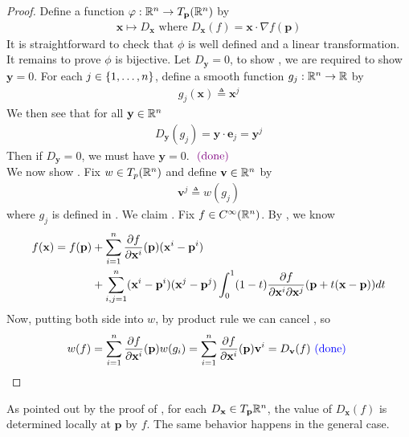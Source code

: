 \documentclass{report}
\begin{document}
\begin{proof}
Define a function $\varphi:\mathbb{R}^n\to T_\textbf{p}(\mathbb{R}^n)$ by 
\begin{align*}
\textbf{x}\mapsto D_\textbf{x}\text{ where }D_\textbf{x}(f)= \textbf{x}\cdot \nabla f(\textbf{p})
\end{align*}
It is straightforward to check that $\phi$ is well defined and a linear transformation. It remains to prove $\phi$ is bijective. Let $D_\textbf{y}=0$, to show , we are required to show $\textbf{y}=0$. For each $j \in \{ 1,\dots, n \}$, define a smooth function $g_j:\mathbb{R}^n\rightarrow \mathbb{R}$ by
\begin{align}
\label{fjxj}
g_j(\textbf{x})\triangleq \textbf{x}^j
\end{align}
We then see that for all $\textbf{y}\in\mathbb{R}^n$
\begin{align*}
D_\textbf{y}(g_j)=\textbf{y}\cdot \textbf{e}_j= \textbf{y}^j
\end{align*}
Then if $D_\textbf{y}=0$, we must have $\textbf{y}=0$. $\textcolor{violet}{\text{ (done) }}$ \\

We now show . Fix $w\in T_p(\mathbb{R}^n)$ and define $\textbf{v}\in\mathbb{R}^n$ by 
\begin{align*}
\textbf{v}^j \triangleq w(g_j)
\end{align*}
where $g_j$ is defined in  . We claim . Fix $f \in C^{\infty}(\mathbb{R}^n)$. By , we know 
\begin{align}
  f(\textbf{x})=f(\textbf{p})&+ \sum_{i=1}^n \frac{\partial f}{\partial \textbf{x}^i}(\textbf{p})(\textbf{x}^i - \textbf{p}^i)\notag
 \\ 
 & +\sum_{i,j=1}^n (\textbf{x}^i-\textbf{p}^i)(\textbf{x}^j-\textbf{p}^j)\int_0^1 (1-t) \frac{\partial f}{\partial \textbf{x}^i \partial \textbf{x}^j}(\textbf{p}+t (\textbf{x}-\textbf{p}))dt \label{vp}
\end{align}
Now, putting both side into $w$, by product rule we can cancel , so
 \begin{align*}
w(f)= \sum_{i=1}^n \frac{\partial f}{\partial \textbf{x}^i}(\textbf{p})w(g_i)= \sum_{i=1}^n \frac{\partial f}{\partial \textbf{x}^i}(\textbf{p})\textbf{v}^i= D_\textbf{v}(f) \textcolor{blue}{\text{ (done) }}
\end{align*}
\end{proof}
\begin{mdframed}
As pointed out by the proof of , for each $D_\textbf{x}\in T_\textbf{p}\mathbb{R}^n$, the value of $D_\textbf{x}(f)$ is determined locally at $\textbf{p}$ by $f$. The same behavior happens in the general case. 
\end{mdframed}
\end{document}
